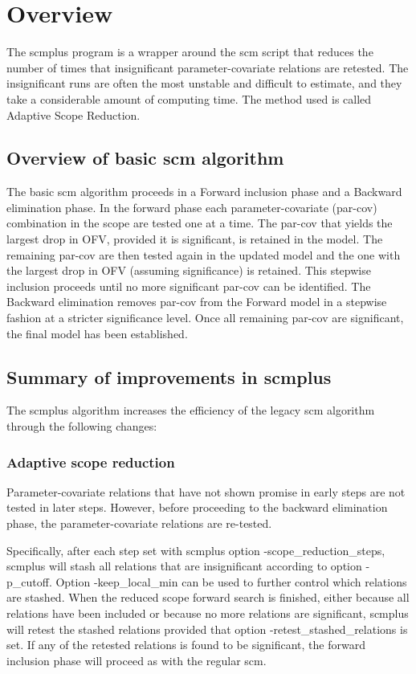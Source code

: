 \documentclass[hideglossary,notoc,hidelof,hidelot,hideTheSignaturePage,hideLinkCurrent,hideloa,pdfLatex,noClient,notitle,hideConfidential]{PMXstyle-20170118kajsa4}
\begin{document}
\section{Overview}
The scmplus program is a wrapper around the scm script that reduces the number of times
that insignificant parameter-covariate relations are retested. The insignificant runs are often
the most unstable and difficult to estimate, and they take a considerable amount of computing time.
The method used is called Adaptive Scope Reduction.

\subsection{Overview of basic scm algorithm}

The basic scm algorithm proceeds in a Forward inclusion phase and a
Backward elimination phase. In the forward phase each parameter-covariate (par-cov) combination 
in the scope are tested one
at a time. The par-cov that yields the largest drop in OFV, provided it is
significant, is retained in the model. The remaining par-cov are then
tested again in the updated model and the one with the largest drop in
OFV (assuming significance) is retained. This stepwise inclusion
proceeds until no more significant par-cov can be identified. The
Backward elimination removes par-cov from the Forward model in a
stepwise fashion at a stricter significance level. Once all remaining par-cov 
are significant, the final model has been established.


\subsection{Summary of improvements in scmplus}
The scmplus algorithm increases the efficiency of the legacy scm
algorithm through the following changes:
\subsubsection{Adaptive scope reduction} 
Parameter-covariate relations that have
not shown promise in early steps are not tested in later steps. However,
before proceeding to the backward elimination phase, the 
parameter-covariate relations are re-tested. 

Specifically, after each step
set with scmplus option -scope\_reduction\_steps, scmplus will stash all relations that are insignificant
according to option -p\_cutoff. Option -keep\_local\_min can be used to further control which relations
are stashed.
When the reduced scope forward search is finished, either because all relations have been included or
because no more relations are significant, scmplus will retest the stashed relations provided that option
-retest\_stashed\_relations is set. If any of the retested relations is found to be significant,
the forward inclusion phase will proceed as with the regular scm.
\end{document}
